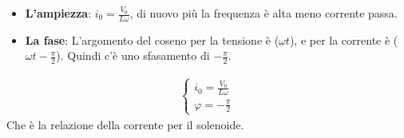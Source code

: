 \documentclass[a4paper, oneside]{article}
\begin{document}
\begin{itemize}
    \item \textbf{L'ampiezza}: $i_0 = \frac{V_0}{L \omega}$, di nuovo più la frequenza è alta meno corrente passa.
    \item \textbf{La fase}: L'argomento del coseno per la tensione è ($\omega t$), e per la corrente è ($\omega t - \frac{\pi}{2}$). Quindi c'è uno sfasamento di $-\frac{\pi}{2}$.
\end{itemize}
\begin{gather*}
    \begin{cases}
        i_0 = \frac{V_0}{L \omega}\\
        \varphi = -\frac{\pi}{2}
    \end{cases}
\end{gather*}
Che è la relazione della corrente per il solenoide.\\
\end{document}
